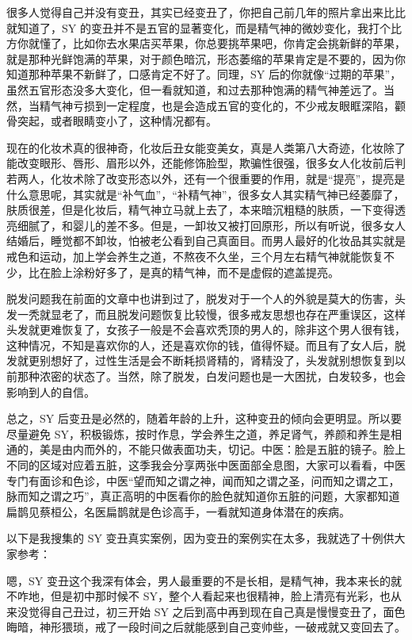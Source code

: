 很多人觉得自己并没有变丑，其实已经变丑了，你把自己前几年的照片拿出来比比就知道了，SY 的变丑并不是五官的显著变化，而是精气神的微妙变化，我打个比方你就懂了，比如你去水果店买苹果，你总要挑苹果吧，你肯定会挑新鲜的苹果，就是那种光鲜饱满的苹果，对于颜色暗沉，形态萎缩的苹果肯定是不要的，因为你知道那种苹果不新鲜了，口感肯定不好了。同理，SY 后的你就像“过期的苹果”，虽然五官形态没多大变化，但一看就知道，和过去那种饱满的精气神差远了。当然，当精气神亏损到一定程度，也是会造成五官的变化的，不少戒友眼眶深陷，颧骨突起，或者眼睛变小了，这种情况都有。

现在的化妆术真的很神奇，化妆后丑女能变美女，真是人类第八大奇迹，化妆除了能改变眼形、唇形、眉形以外，还能修饰脸型，欺骗性很强，很多女人化妆前后判若两人，化妆术除了改变形态以外，还有一个很重要的作用，就是“提亮”，提亮是什么意思呢，其实就是“补气血”，“补精气神”，很多女人其实精气神已经萎靡了，肤质很差，但是化妆后，精气神立马就上去了，本来暗沉粗糙的肤质，一下变得透亮细腻了，和婴儿的差不多。但是，一卸妆又被打回原形，所以有听说，很多女人结婚后，睡觉都不卸妆，怕被老公看到自己真面目。而男人最好的化妆品其实就是戒色和运动，加上学会养生之道，不熬夜不久坐，三个月左右精气神就能恢复不少，比在脸上涂粉好多了，是真的精气神，而不是虚假的遮盖提亮。

脱发问题我在前面的文章中也讲到过了，脱发对于一个人的外貌是莫大的伤害，头发一秃就显老了，而且脱发问题恢复比较慢，很多戒友思想也存在严重误区，这样头发就更难恢复了，女孩子一般是不会喜欢秃顶的男人的，除非这个男人很有钱，这种情况，不知是喜欢你的人，还是喜欢你的钱，值得怀疑。而且有了女人后，脱发就更别想好了，过性生活是会不断耗损肾精的，肾精没了，头发就别想恢复到以前那种浓密的状态了。当然，除了脱发，白发问题也是一大困扰，白发较多，也会影响到人的自信。

总之，SY 后变丑是必然的，随着年龄的上升，这种变丑的倾向会更明显。所以要尽量避免 SY，积极锻炼，按时作息，学会养生之道，养足肾气，养颜和养生是相通的，美是由内而外的，不能只做表面功夫，切记。中医：脸是五脏的镜子。脸上不同的区域对应着五脏，这季我会分享两张中医面部全息图，大家可以看看，中医专门有面诊和色诊，中医“望而知之谓之神，闻而知之谓之圣，问而知之谓之工，脉而知之谓之巧”，真正高明的中医看你的脸色就知道你五脏的问题，大家都知道扁鹊见蔡桓公，名医扁鹊就是色诊高手，一看就知道身体潜在的疾病。

以下是我搜集的 SY 变丑真实案例，因为变丑的案例实在太多，我就选了十例供大家参考：

\begin{case}[SY 变丑]
    嗯，SY 变丑这个我深有体会，男人最重要的不是长相，是精气神，我本来长的就不咋地，但是初中那时候不 SY，整个人看起来也很精神，脸上清亮有光彩，也从来没觉得自己丑过，初三开始 SY 之后到高中再到现在自己真是慢慢变丑了，面色晦暗，神形猥琐，戒了一段时间之后就能感到自己变帅些，一破戒就又变回去了。
\end{case}

